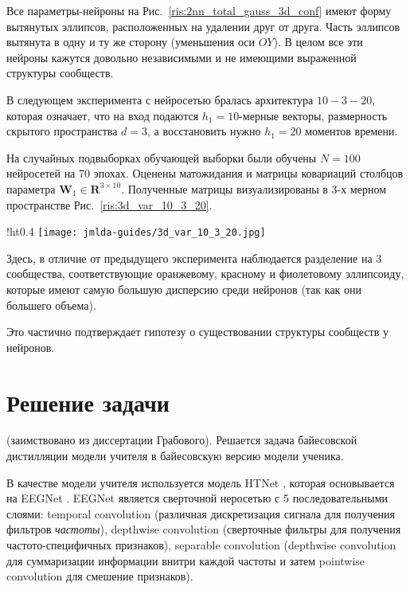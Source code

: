 \documentclass[12pt, twoside]{article}
\begin{document}
Все параметры-нейроны на Рис.~\ref{ris:2nn_total_gauss_3d_conf} имеют форму вытянутых эллипсов, расположенных на удалении друг от друга. Часть эллипсов вытянута в одну и ту же сторону (уменьшения оси $OY$). В целом все эти нейроны кажутся довольно независимыми и не имеющими выраженной структуры сообществ.

В следующем эксперимента с нейросетью бралась архитектура $10-3-20$, которая означает, что на вход подаются $h_1=10$-мерные векторы, размерность скрытого пространства $d=3$, а восстановить нужно $h_1=20$ моментов времени.

На случайных подвыборках обучающей выборки были обучены $N=100$ нейросетей на 70 эпохах. Оценены матожидания и матрицы ковариаций столбцов параметра $\mathbf{W}_1 \in \mathbf{R}^{3 \times 10}$. Полученные матрицы визуализированы в 3-х мерном пространстве Рис.~\ref{ris:3d_var_10_3_20}.

\begin{wrapfigure}{!ht}{0.4\textwidth}
\texttt{[image: jmlda-guides/3d\_var\_10\_3\_20.jpg]}
\caption{Доверительные области 3-х мерных векторов двуслойной нейросети арихитектуры 10-3-20.}
\label{ris:3d_var_10_3_20}
\end{wrapfigure}

Здесь, в отличие от предыдущего эксперимента наблюдается разделение на 3 сообщества, соответствующие оранжевому, красному и фиолетовому эллипсоиду, которые имеют самую большую дисперсию среди нейронов (так как они большего объема).

Это частично подтверждает гипотезу о существовании структуры сообществ у нейронов.
\newpage
\section{Решение задачи}
(заимствовано из диссертации Грабового).
Решается задача байесовской дистилляции модели учителя в байесовскую версию модели ученика.

В качестве модели учителя используется модель HTNet \citep{peterson2021generalized}, которая основывается на EEGNet \citep{lawhern2018eegnet}. EEGNet является сверточной неросетью с 5 последовательными слоями: temporal convolution (различная дискретизация сигнала для получения фильтров \textit{частоты}), depthwise convolution (сверточные фильтры для получения частото-специфичных признаков), separable convolution (depthwise convolution для суммаризации информации внитри каждой частоты и затем pointwise convolution для смешение признаков).
\end{document}
